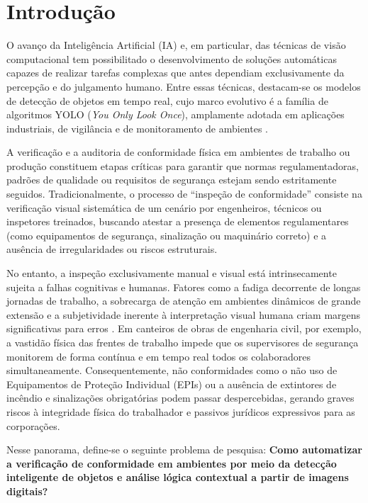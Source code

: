 \chapter{Introdução}
\label{chap:introducao}

O avanço da Inteligência Artificial (IA) e, em particular, das técnicas de visão computacional tem possibilitado o desenvolvimento de soluções automáticas capazes de realizar tarefas complexas que antes dependiam exclusivamente da percepção e do julgamento humano. Entre essas técnicas, destacam-se os modelos de detecção de objetos em tempo real, cujo marco evolutivo é a família de algoritmos YOLO (\textit{You Only Look Once}), amplamente adotada em aplicações industriais, de vigilância e de monitoramento de ambientes \cite{redmon2016you, terven2023comprehensive}.

A verificação e a auditoria de conformidade física em ambientes de trabalho ou produção constituem etapas críticas para garantir que normas regulamentadoras, padrões de qualidade ou requisitos de segurança estejam sendo estritamente seguidos. Tradicionalmente, o processo de ``inspeção de conformidade'' consiste na verificação visual sistemática de um cenário por engenheiros, técnicos ou inspetores treinados, buscando atestar a presença de elementos regulamentares (como equipamentos de segurança, sinalização ou maquinário correto) e a ausência de irregularidades ou riscos estruturais.

No entanto, a inspeção exclusivamente manual e visual está intrinsecamente sujeita a falhas cognitivas e humanas. Fatores como a fadiga decorrente de longas jornadas de trabalho, a sobrecarga de atenção em ambientes dinâmicos de grande extensão e a subjetividade inerente à interpretação visual humana criam margens significativas para erros \cite{rahman2021context}. Em canteiros de obras de engenharia civil, por exemplo, a vastidão física das frentes de trabalho impede que os supervisores de segurança monitorem de forma contínua e em tempo real todos os colaboradores simultaneamente. Consequentemente, não conformidades como o não uso de Equipamentos de Proteção Individual (EPIs) ou a ausência de extintores de incêndio e sinalizações obrigatórias podem passar despercebidas, gerando graves riscos à integridade física do trabalhador e passivos jurídicos expressivos para as corporações.

Nesse panorama, define-se o seguinte problema de pesquisa: \textbf{Como automatizar a verificação de conformidade em ambientes por meio da detecção inteligente de objetos e análise lógica contextual a partir de imagens digitais?}

